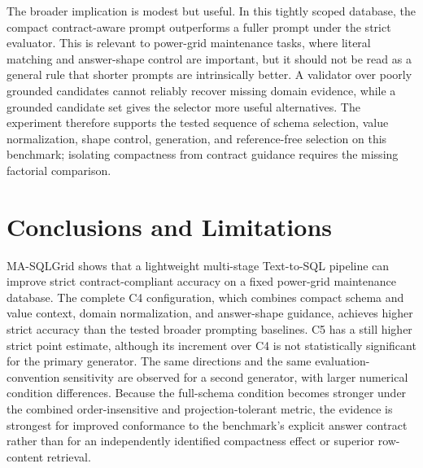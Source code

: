 \documentclass[cmc,article,submit,moreauthors,pdftex]{Definitions/tsp}
\begin{document}
The broader implication is modest but useful. In this tightly scoped database, the compact contract-aware prompt outperforms a fuller prompt under the strict evaluator. This is relevant to power-grid maintenance tasks, where literal matching and answer-shape control are important, but it should not be read as a general rule that shorter prompts are intrinsically better. A validator over poorly grounded candidates cannot reliably recover missing domain evidence, while a grounded candidate set gives the selector more useful alternatives. The experiment therefore supports the tested sequence of schema selection, value normalization, shape control, generation, and reference-free selection on this benchmark; isolating compactness from contract guidance requires the missing factorial comparison.

\section{Conclusions and Limitations}\label{conclusion}

MA-SQLGrid shows that a lightweight multi-stage Text-to-SQL pipeline can improve strict contract-compliant accuracy on a fixed power-grid maintenance database. The complete C4 configuration, which combines compact schema and value context, domain normalization, and answer-shape guidance, achieves higher strict accuracy than the tested broader prompting baselines. C5 has a still higher strict point estimate, although its increment over C4 is not statistically significant for the primary generator. The same directions and the same evaluation-convention sensitivity are observed for a second generator, with larger numerical condition differences. Because the full-schema condition becomes stronger under the combined order-insensitive and projection-tolerant metric, the evidence is strongest for improved conformance to the benchmark's explicit answer contract rather than for an independently identified compactness effect or superior row-content retrieval.
\end{document}
